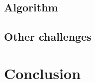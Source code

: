 \documentclass[english]{tktltiki}
\begin{document}
\subsection{Algorithm}



\subsection{Other challenges}



\section{Conclusion}



\nocite{*}




\lastpage

\appendices

\pagestyle{empty}
\end{document}
